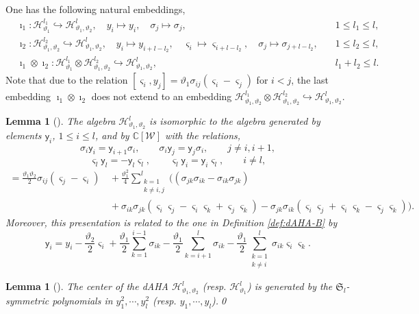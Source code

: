\documentclass[11pt,reqno]{amsart}
\numberwithin{equation}{section}
\newtheorem{lem}[thm]{Lemma}
\theoremstyle{definition}
\theoremstyle{remark}
\newcommand{\sfy}{\mathsf{y}}
\newcommand{\fkS}{\mathfrak{S}}
\newcommand{\bC}{\mathbb{C}}
\newcommand{\lle}{\leqslant}
\newcommand{\qedd}{\tag*{$\square$}}
\begin{document}
One has the following natural embeddings,
\begin{align}
&\imath_1: \mathscr{H}_{\vartheta_1}^{l_1} \hookrightarrow\mathscr{H}_{\vartheta_1,\vartheta_2}^l,\quad y_i\mapsto y_i,\quad \sigma_j\mapsto \sigma_j, \quad &1\lle l_1\lle l,\label{i1embed}
\\
&\imath_2: \mathscr{H}_{\vartheta_1,\vartheta_2}^{l_2} \hookrightarrow\mathscr{H}_{\vartheta_1,\vartheta_2}^l,\quad y_i\mapsto y_{i+l-l_2},\quad \varsigma_i\mapsto \varsigma_{i+l-l_2},\quad \sigma_j\mapsto \sigma_{j+l-l_2}, \quad &1\lle l_2\lle l,\nonumber
\\
& \imath_1\otimes \imath_2: \mathscr{H}_{\vartheta_1}^{l_1}\otimes \mathscr{H}_{\vartheta_1,\vartheta_2}^{l_2}\hookrightarrow \mathscr{H}_{\vartheta_1,\vartheta_2}^l,\quad &l_1+l_2\lle l.\label{eq:embedding-hecke}
\end{align}
Note that due to the relation $[\varsigma_i,y_j]=\vartheta_1\sigma_{ij}(\varsigma_i-\varsigma_j)$ for $i<j$, the last embedding $\imath_1\otimes \imath_2$ does not extend to an embedding $\mathscr{H}_{\vartheta_1,\vartheta_2}^{l_1}\otimes \mathscr{H}_{\vartheta_1,\vartheta_2}^{l_2}\hookrightarrow \mathscr{H}_{\vartheta_1,\vartheta_2}^l$.
\begin{lem} [{\cite[Lemma 3.1]{Etingof2009}}]\label{lem:dAHA-B-other}
The algebra $\mathscr{H}_{\vartheta_1,\vartheta_2}^l$ is isomorphic to the algebra generated by elements $\sfy_i$, $1\lle i\lle l$, and by $\bC[\mathscr W]$ with the relations,
\[
\sigma_i\sfy_i=\sfy_{i+1}\sigma_i,\qquad \sigma_i\sfy_j=\sfy_{j}\sigma_i,\qquad j\ne i,i+1,
\]
\[
\varsigma_l\sfy_l=-\sfy_{l}\varsigma_l,\qquad
\varsigma_l\sfy_i=\sfy_i\varsigma_l,\qquad i\ne l,
\]
\begin{align*}
    [\sfy_i,\sfy_j]= \frac{\vartheta_1 \vartheta_2}{2}\sigma_{ij}(\varsigma_j-\varsigma_i)&\,+\frac{\vartheta_1^2}{4}\sum_{\substack{k=1 \\ k\ne i,j}}^l\Big((\sigma_{jk}\sigma_{ik}-\sigma_{ik}\sigma_{jk})\\
    &\, +\sigma_{ik}\sigma_{jk}(\varsigma_i\varsigma_j-\varsigma_i\varsigma_k+\varsigma_j\varsigma_k)-\sigma_{jk}\sigma_{ik}(\varsigma_i\varsigma_j+\varsigma_i\varsigma_k-\varsigma_j\varsigma_k)\Big).
\end{align*}
Moreover, this presentation is related to the one in Definition \ref{def:dAHA-B} by
\[
\sfy_i=y_i-\frac{\vartheta_2}{2}\varsigma_i+\frac{\vartheta_1}{2}\sum_{k=1}^{i-1}\sigma_{ik}-\frac{\vartheta_1}{2}\sum_{k=i+1}^l\sigma_{ik}-\frac{\vartheta_1}{2}\sum_{\substack{k=1 \\ k\ne i}}^l\sigma_{ik}\varsigma_i\varsigma_k.\qedd
\]
\end{lem}
\begin{lem}[{\cite[3.12]{Lusztig1989affine}}]
The center of the dAHA $\mathscr{H}_{\vartheta_1,\vartheta_2}^l$ (resp. $\mathscr{H}_{\vartheta_1}^l$) is generated by the $\fkS_l$-symmetric polynomials in $y_1^2,\cdots,y_l^2$ (resp. $y_1,\cdots,y_l$).\qed
\end{lem}
\end{document}

